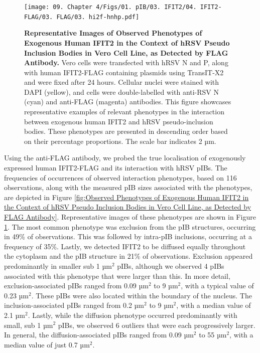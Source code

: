 \begin{figure}
    \centering
    \texttt{[image: 09. Chapter 4/Figs/01. pIB/03. IFIT2/04. IFIT2-FLAG/03. FLAG/03. hi2f-hnhp.pdf]}
    \caption[Representative Images of Observed Phenotypes of Exogenous Human IFIT2 in the Context of hRSV Pseudo Inclusion Bodies in Vero Cell Line, as Detected by FLAG Antibody.]{\textbf{Representative Images of Observed Phenotypes of Exogenous Human IFIT2 in the Context of hRSV Pseudo Inclusion Bodies in Vero Cell Line, as Detected by FLAG Antibody.} Vero cells were transfected with hRSV N and P, along with human IFIT2-FLAG containing plasmids using TransIT-X2 and were fixed after 24 hours. Cellular nuclei were stained with DAPI (yellow), and cells were double-labelled with anti-RSV N (cyan) and anti-FLAG (magenta) antibodies. This figure showcases representative examples of relevant phenotypes in the interaction between exogenous human IFIT2 and hRSV pseudo-inclusion bodies. These phenotypes are presented in descending order based on their percentage proportions. The scale bar indicates 2 µm.}
    \label{fig:Representative Images of Observed Phenotypes of Exogenous Human IFIT2 in the Context of hRSV Pseudo Inclusion Bodies in Vero Cell Line, as Detected by FLAG Antibody}
\end{figure}

Using the anti-FLAG antibody, we probed the true localisation of exogenously expressed human IFIT2-FLAG and its interaction with hRSV pIBs. The frequencies of occurrences of observed interaction phenotypes, based on 116 observations, along with the measured pIB sizes associated with the phenotypes, are depicted in Figure \ref{fig:Observed Phenotypes of Exogenous Human IFIT2 in the Context of hRSV Pseudo Inclusion Bodies in Vero Cell Line, as Detected by FLAG Antibody}. Representative images of these phenotypes are shown in Figure \ref{fig:Representative Images of Observed Phenotypes of Exogenous Human IFIT2 in the Context of hRSV Pseudo Inclusion Bodies in Vero Cell Line, as Detected by FLAG Antibody}. The most common phenotype was exclusion from the pIB structures, occurring in 49\% of observations. This was followed by intra-pIB inclusions, occurring at a frequency of 35\%. Lastly, we detected IFIT2 to be diffused equally throughout the cytoplasm and the pIB structure in 21\% of observations. Exclusion appeared predominantly in smaller sub 1 \(\mbox{µm}^2\) pIBs, although we observed 4 pIBs associated with this phenotype that were larger than this. In more detail, exclusion-associated pIBs ranged from 0.09 \(\mbox{µm}^2\) to 9 \(\mbox{µm}^2\), with a typical value of 0.23 \(\mbox{µm}^2\). These pIBs were also located within the boundary of the nucleus. The inclusion-associated pIBs ranged from 0.2 \(\mbox{µm}^2\) to 9 \(\mbox{µm}^2\), with a median value of 2.1 \(\mbox{µm}^2\). Lastly, while the diffusion phenotype occurred predominantly with small, sub 1 \(\mbox{µm}^2\) pIBs, we observed 6 outliers that were each progressively larger. In general, the diffusion-associated pIBs ranged from 0.09 \(\mbox{µm}^2\) to 55 \(\mbox{µm}^2\), with a median value of just 0.7 \(\mbox{µm}^2\).

